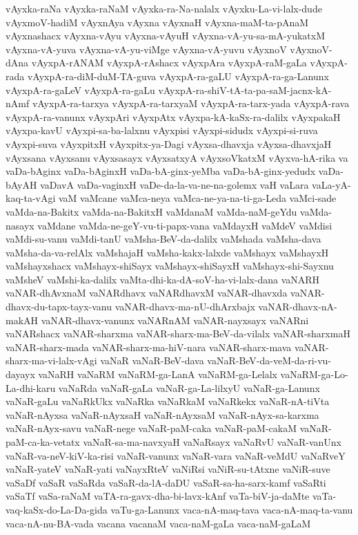 {vAyxka-raNa
vAyxka-raNaM
vAyxka-ra-Na-nalalx
vAyxku-La-vi-lalx-dude
vAyxmoV-hadiM
vAyxnAya
vAyxna
vAyxnaH
vAyxna-maM-ta-pAnaM
vAyxnashacx
vAyxna-vAyu
vAyxna-vAyuH
vAyxna-vA-yu-sa-mA-yukatxM
vAyxna-vA-yuva
vAyxna-vA-yu-viMge
vAyxna-vA-yuvu
vAyxnoV
vAyxnoV-dAna
vAyxpA-rANAM
vAyxpA-rAshacx
vAyxpAra
vAyxpA-raM-gaLa
vAyxpA-rada
vAyxpA-ra-diM-duM-TA-guva
vAyxpA-ra-gaLU
vAyxpA-ra-ga-Lanunx
vAyxpA-ra-gaLeV
vAyxpA-ra-gaLu
vAyxpA-ra-shiV-tA-ta-pa-saM-jacnx-kA-nAmf
vAyxpA-ra-tarxya
vAyxpA-ra-tarxyaM
vAyxpA-ra-tarx-yada
vAyxpA-rava
vAyxpA-ra-vanunx
vAyxpAri
vAyxpAtx
vAyxpa-kA-kaSx-ra-dalilx
vAyxpakaH
vAyxpa-kavU
vAyxpi-sa-ba-lalxnu
vAyxpisi
vAyxpi-sidudx
vAyxpi-si-ruva
vAyxpi-suva
vAyxpitxH
vAyxpitx-ya-Dagi
vAyxsa-dhavxja
vAyxsa-dhavxjaH
vAyxsana
vAyxsanu
vAyxsasayx
vAyxsatxyA
vAyxsoVkatxM
vAyxva-hA-rika
va
vaDa-bAginx
vaDa-bAginxH
vaDa-bA-ginx-yeMba
vaDa-bA-ginx-yedudx
vaDa-bAyAH
vaDavA
vaDa-vaginxH
vaDe-da-la-va-ne-na-golemx
vaH
vaLara
vaLa-yA-kaq-ta-vAgi
vaM
vaMcane
vaMca-neya
vaMca-ne-ya-na-ti-ga-Leda
vaMci-sade
vaMda-na-Bakitx
vaMda-na-BakitxH
vaMdanaM
vaMda-naM-geYdu
vaMda-nasayx
vaMdane
vaMda-ne-geY-vu-ti-papx-vana
vaMdayxH
vaMdeV
vaMdisi
vaMdi-su-vanu
vaMdi-tanU
vaMsha-BeV-da-dalilx
vaMshada
vaMsha-dava
vaMsha-da-va-relAlx
vaMshajaH
vaMsha-kakx-lalxde
vaMshayx
vaMshayxH
vaMshayxshacx
vaMshayx-shiSayx
vaMshayx-shiSayxH
vaMshayx-shi-Sayxnu
vaMsheV
vaMshi-ka-dalilx
vaMta-dhi-ka-dA-soV-ha-vi-lalx-dana
vaNARH
vaNAR-dhAvxnaM
vaNARdhavx
vaNARdhavxM
vaNAR-dhavxda
vaNAR-dhavx-du-tapx-tayx-vanu
vaNAR-dhavx-ma-nU-dhArxbajx
vaNAR-dhavx-nA-makAH
vaNAR-dhavx-vanunx
vaNARnAM
vaNAR-nayxsayx
vaNARni
vaNARshacx
vaNAR-sharxma
vaNAR-sharx-ma-BeV-da-vilalx
vaNAR-sharxmaH
vaNAR-sharx-mada
vaNAR-sharx-ma-hiV-nara
vaNAR-sharx-mava
vaNAR-sharx-ma-vi-lalx-vAgi
vaNaR
vaNaR-BeV-dava
vaNaR-BeV-da-veM-da-ri-vu-dayayx
vaNaRH
vaNaRM
vaNaRM-ga-LanA
vaNaRM-ga-Lelalx
vaNaRM-ga-Lo-La-dhi-karu
vaNaRda
vaNaR-gaLa
vaNaR-ga-La-lilxyU
vaNaR-ga-Lanunx
vaNaR-gaLu
vaNaRkUkx
vaNaRka
vaNaRkaM
vaNaRkekx
vaNaR-nA-tiVta
vaNaR-nAyxsa
vaNaR-nAyxsaH
vaNaR-nAyxsaM
vaNaR-nAyx-sa-karxma
vaNaR-nAyx-savu
vaNaR-nege
vaNaR-paM-caka
vaNaR-paM-cakaM
vaNaR-paM-ca-ka-vetatx
vaNaR-sa-ma-navxyaH
vaNaRsayx
vaNaRvU
vaNaR-vanUnx
vaNaR-va-neV-kiV-ka-risi
vaNaR-vanunx
vaNaR-vara
vaNaR-veMdU
vaNaRveY
vaNaR-yateV
vaNaR-yati
vaNayxRteV
vaNiRsi
vaNiR-su-tAtxne
vaNiR-suve
vaSaDf
vaSaR
vaSaRda
vaSaR-da-lA-daDU
vaSaR-sa-ha-sarx-kamf
vaSaRti
vaSaTf
vaSa-raNaM
vaTA-ra-gavx-dha-bi-lavx-kAnf
vaTa-biV-ja-daMte
vaTa-vaq-kaSx-do-La-Da-gida
vaTu-ga-Lanunx
vaca-nA-maq-tava
vaca-nA-maq-ta-vanu
vaca-nA-nu-BA-vada
vacana
vacanaM
vaca-naM-gaLa
vaca-naM-gaLaM
}
